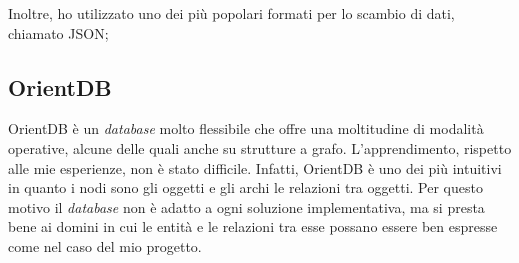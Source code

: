 	Inoltre, ho utilizzato uno dei più popolari formati per lo scambio di dati, chiamato \gls{JSON};

	\subsection*{OrientDB} 
	OrientDB è un \textit{database} molto flessibile che offre una moltitudine di modalità operative, alcune delle quali anche su strutture a grafo. L'apprendimento, rispetto alle mie esperienze, non è stato difficile. Infatti, OrientDB è uno dei più intuitivi in quanto i nodi sono gli oggetti e gli archi le relazioni tra oggetti. Per questo motivo il \textit{database} non è adatto a ogni soluzione implementativa, ma si presta bene ai domini in cui le entità e le relazioni tra esse possano essere ben espresse come nel caso del mio progetto.

